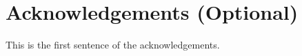 \documentclass{vie16}
\begin{document}
		
		
\section{Acknowledgements (Optional)}

This is the first sentence of the acknowledgements.

%
%
% 
\end{document}
